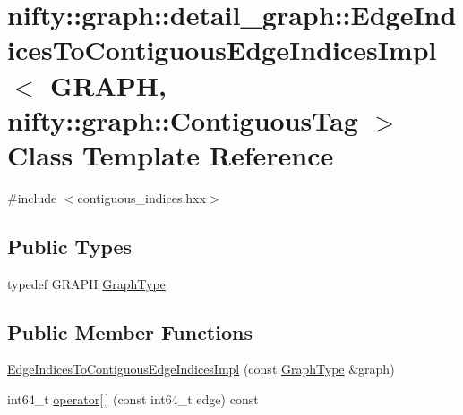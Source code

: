 \hypertarget{classnifty_1_1graph_1_1detail__graph_1_1EdgeIndicesToContiguousEdgeIndicesImpl_3_01GRAPH_00_01ni85a4007f22b365a25e3bd0829bce5cfc}{}\section{nifty\+:\+:graph\+:\+:detail\+\_\+graph\+:\+:Edge\+Indices\+To\+Contiguous\+Edge\+Indices\+Impl$<$ G\+R\+A\+PH, nifty\+:\+:graph\+:\+:Contiguous\+Tag $>$ Class Template Reference}
\label{classnifty_1_1graph_1_1detail__graph_1_1EdgeIndicesToContiguousEdgeIndicesImpl_3_01GRAPH_00_01ni85a4007f22b365a25e3bd0829bce5cfc}


{\ttfamily \#include $<$contiguous\+\_\+indices.\+hxx$>$}

\subsection*{Public Types}
\begin{DoxyCompactItemize}
\item 
typedef G\+R\+A\+PH \hyperlink{classnifty_1_1graph_1_1detail__graph_1_1EdgeIndicesToContiguousEdgeIndicesImpl_3_01GRAPH_00_01ni85a4007f22b365a25e3bd0829bce5cfc_a928b2c3e5ef48c1b5af76cf008ad7d9c}{Graph\+Type}
\end{DoxyCompactItemize}
\subsection*{Public Member Functions}
\begin{DoxyCompactItemize}
\item 
\hyperlink{classnifty_1_1graph_1_1detail__graph_1_1EdgeIndicesToContiguousEdgeIndicesImpl_3_01GRAPH_00_01ni85a4007f22b365a25e3bd0829bce5cfc_ad02c81f222261b4f465424dc366b7e08}{Edge\+Indices\+To\+Contiguous\+Edge\+Indices\+Impl} (const \hyperlink{classnifty_1_1graph_1_1detail__graph_1_1EdgeIndicesToContiguousEdgeIndicesImpl_3_01GRAPH_00_01ni85a4007f22b365a25e3bd0829bce5cfc_a928b2c3e5ef48c1b5af76cf008ad7d9c}{Graph\+Type} \&graph)
\item 
int64\+\_\+t \hyperlink{classnifty_1_1graph_1_1detail__graph_1_1EdgeIndicesToContiguousEdgeIndicesImpl_3_01GRAPH_00_01ni85a4007f22b365a25e3bd0829bce5cfc_ac2d90ab9eed3102c6f726c3282d24eef}{operator\mbox{[}$\,$\mbox{]}} (const int64\+\_\+t edge) const
\end{DoxyCompactItemize}


